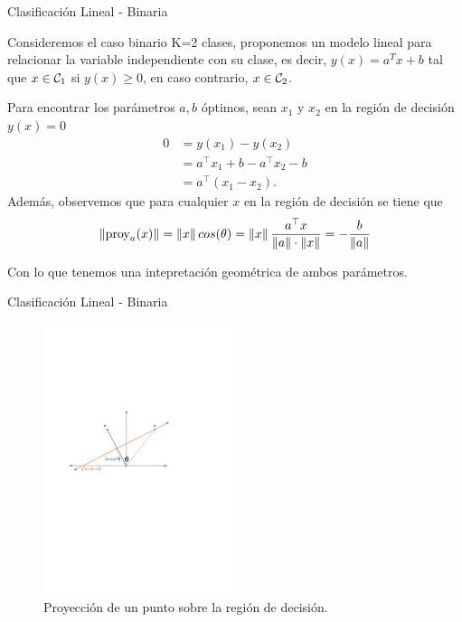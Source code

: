 \documentclass[9pt]{beamer}
\begin{document}
\begin{frame}{Clasificación Lineal - Binaria}

Consideremos el caso binario K=2 clases, proponemos un modelo lineal para relacionar la variable independiente con su clase, es decir, $y(x) = a^Tx+b$ tal que  $x \in {\mathcal C}_1$ si $y(x) \geq 0$, en caso contrario,  $x \in {\mathcal C}_2$. \pause

Para encontrar los parámetros $a,b$ óptimos, sean $x_1$ y $x_2$ en la región de decisión $y(x)=0$ \pause  
\begin{align*}
  0 &= y(x_1) - y(x_2) \nonumber\\ 
    &= a^\top x_1 + b - a^\top x_2 - b \nonumber\\ 
    &= a^\top (x_1-x_2).
\end{align*}
\pause
Además, observemos que para cualquier $x$ en la región de decisión se tiene que 
\begin{equation*}
  \left\lVert\text{proy}_a(x)\right\rVert = \left\lVert x\right\rVert cos(\theta) = \left\lVert x\right\rVert \frac{a^\top x}{\left\lVert a\right\rVert\cdot\left\lVert x\right\rVert} = -\frac{b}{\left\lVert a\right\rVert}
\end{equation*}

Con lo que tenemos una intepretación geométrica de ambos parámetros. 

\end{frame}

\begin{frame}{Clasificación Lineal - Binaria}

\begin{figure}[h]
    \centering
    \includegraphics[width=0.5\textwidth]{../img/cap3_proy.pdf}
    \caption{Proyección de un punto sobre la región de decisión. }
\end{figure}


\end{frame}
\end{document}
